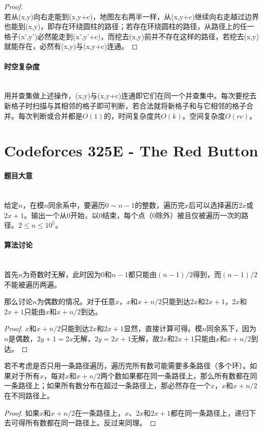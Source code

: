 \documentclass[UTF8]{ctexart}
\newcommand{\myparagraph}[1]{\paragraph{#1}\mbox{}\\}
\theoremstyle{nonumberplain}
\newtheorem{proof}{\hspace{1em}证明：}
\begin{document}
			\begin{proof}\mbox{}\\
			
				若从(x,y)向右走能到(x,y+c)，地图左右两半一样，从(x,y+c)继续向右走越过边界也能到(x,y)，即存在环绕圆柱的路径；若存在环绕圆柱的路径，从路径上的任一格子(x',y')必然能走到(x',y'+c)，而挖去(x,y)前并不存在这样的路径，若挖去(x,y)就能存在，必然有(x,y)与(x,y+c)连通。
			
			\end{proof}
		
		\myparagraph{时空复杂度}
		
			用并查集做上述操作，(x,y)与(x,y+c)连通即它们在同一个并查集中。每次要挖去新格子时扫描与其相邻的格子即可判断，若合法就将新格子和与它相邻的格子合并。每次判断或合并都是$O(1)$的，时间复杂度共$O(k)$。空间复杂度$O(rc)$。
	
	\section{Codeforces 325E - The Red Button}
	
		\myparagraph{题目大意}
		
			给定$n$，在模$n$同余系中，要遍历$0 \sim n-1$的整数，遍历完$x$后可以选择遍历$2x$或$2x+1$。输出一个从0开始，以0结束，每个点（0除外）被且仅被遍历一次的路径。$2 \leq n \leq 10^5$。
		
		\myparagraph{算法讨论}
		
			首先$n$为奇数时无解，此时因为0和$n-1$都只能由$(n-1)/2$得到，而$(n-1)/2$不能被遍历两遍。
			
			那么讨论$n$为偶数的情况。对于任意$x$，$x$和$x+n/2$只能到达$2x$和$2x+1$，$2x$和$2x+1$只能由$x$和$x+n/2$到达。
			
			\begin{proof} $x$和$x+n/2$只能到达$2x$和$2x+1$显然，直接计算可得。模$n$同余系下，因为$n$是偶数，$2y+1=2x$无解，$2y=2x+1$无解，故$2x$和$2x+1$只能由$x$和$x+n/2$到达。 \end{proof}
			
			若不考虑是否只用一条路径遍历，遍历完所有数可能需要多条路径（多个环）。如果对于所有$x$，每对$x$和$x+n/2$两个数如果都在同一条路径上，那么所有数都在同一条路径上；如果所有数分布在超过一条路径上，那必然存在一个$x$，$x$和$x+n/2$在不同路径上。
			
			\begin{proof} 如果$x$和$x+n/2$在一条路径上，$x$、$2x$和$2x+1$都在同一条路径上，递归下去可得所有数都在同一路径上。反过来同理。 \end{proof}
			
\end{document}
